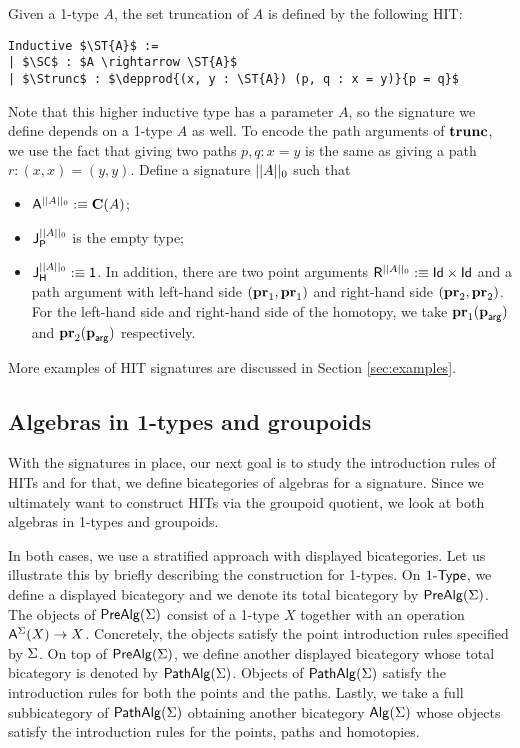 \begin{example}
\label{ex:settrunc}
Given a 1-type $A$,  the set truncation of $A$ is defined by the following HIT:
\begin{lstlisting}[mathescape=true]
Inductive $\ST{A}$ :=
| $\SC$ : $A \rightarrow \ST{A}$
| $\Strunc$ : $\depprod{(x, y : \ST{A}) (p, q : x = y)}{p = q}$
\end{lstlisting}
Note that this higher inductive type has a parameter $A$,
so the signature we define depends on a 1-type $A$ as well.
To encode the path arguments of $\Strunc$, we use the fact that giving two paths $p, q : x = y$ is the same as giving a path $r : (x, x) = (y, y)$.
Define a signature $\ST{A}$ such that
\begin{itemize}
	\item $\pointconstr[\ST{A}] \eqdef \constantP{A}$;
	\item $\pathlabel[\ST{A}]$ is the empty type;
	\item $\homotlabel[\ST{A}] \eqdef \unit$.
	In addition, there are two point arguments $\homotpointarg[\ST{A}] \eqdef \prodP{\idP}{\idP}$
	and a path argument with left-hand side $\pair{\prle}{\prle}$ and right-hand side $\pair{\prre}{\prre}$.
	For the left-hand side and right-hand side of the homotopy, we take $\hprl{\harg}$ and $\hprr{\harg}$ respectively.
\end{itemize}
\end{example}


More examples of HIT signatures are discussed in Section \ref{sec:examples}.

\subsection{Algebras in 1-types and groupoids}
With the signatures in place, our next goal is to study the introduction rules of HITs and for that, we define bicategories of algebras for a signature.
Since we ultimately want to construct HITs via the groupoid quotient, we look at both algebras in 1-types and groupoids.

In both cases, we use a stratified approach with displayed bicategories.
Let us illustrate this by briefly describing the construction for 1-types.
On $\onetypes$, we define a displayed bicategory and we denote its total bicategory by $\prealg{\sign}$.
The objects of $\prealg{\sign}$ consist of a 1-type $X$ together with an operation $\polyAct{\pointconstr[\sign]}{X} \rightarrow X$.
Concretely, the objects satisfy the point introduction rules specified by $\sign$.
On top of $\prealg{\sign}$, we define another displayed bicategory whose total bicategory is denoted by $\pathalg{\sign}$.
Objects of $\pathalg{\sign}$ satisfy the introduction rules for both the points and the paths.
Lastly, we take a full subbicategory of $\pathalg{\sign}$ obtaining another bicategory $\alg(\sign)$ whose objects satisfy the introduction rules for the points, paths and homotopies.

